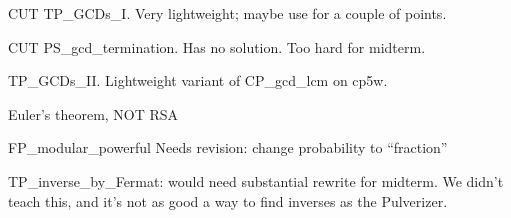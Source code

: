 \documentclass[quiz]{mcs}
\begin{document}


\begin{staffnotes}
CUT TP\_GCDs\_I.  Very lightweight; maybe use for a couple of points.
\end{staffnotes}

\begin{staffnotes}
CUT PS\_gcd\_termination.  Has no solution.  Too hard for midterm.
\end{staffnotes}



\begin{staffnotes}
TP\_GCDs\_II.  Lightweight variant of CP\_gcd\_lcm on cp5w.
\end{staffnotes}

\begin{center}
{\large Euler's theorem, NOT RSA}
\end{center}




\begin{staffnotes}
FP\_modular\_powerful Needs revision: change probability to ``fraction''
\end{staffnotes}



\begin{staffnotes}
TP\_inverse\_by\_Fermat: would need substantial rewrite for midterm.
We didn't teach this, and it's not as good a way to find inverses as
the Pulverizer.
\end{staffnotes}

\end{document}
